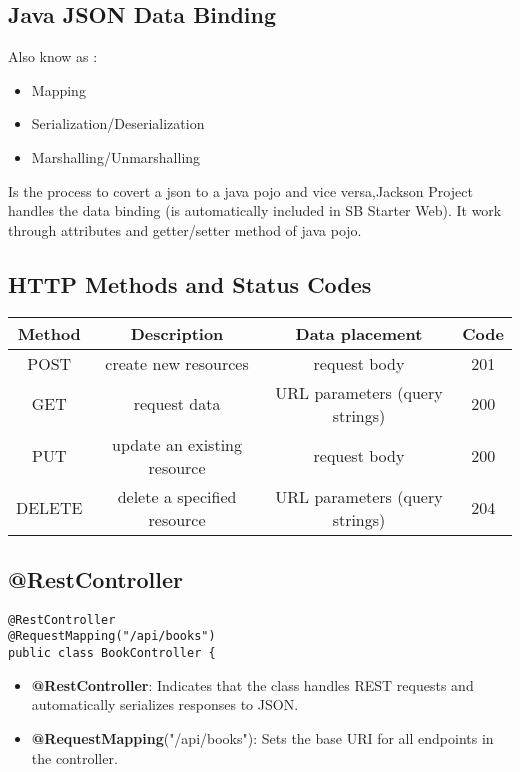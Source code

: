 \documentclass[a4paper, 12pt]{article}
\begin{document}
    \subsection{Java JSON Data Binding}
    Also know as :
    \begin{itemize}
        \item Mapping
        \item Serialization/Deserialization
        \item Marshalling/Unmarshalling
    \end{itemize}
    Is the process to covert a json to a java pojo and vice versa,Jackson Project handles the data binding (is automatically included in SB Starter Web). It work through attributes and getter/setter method of java pojo.

    \subsection{HTTP Methods and Status Codes}
    \begin{table}[h!]
        \centering
        \begin{tabular}{|c|c|c|c|}
            \hline
            Method & Description                 & Data placement                 & Code \\ \hline
            POST   & create new resources        & request body                   & 201  \\ \hline
            GET    & request data                & URL parameters (query strings) & 200  \\ \hline
            PUT    & update an existing resource & request body                   & 200  \\ \hline
            DELETE & delete a specified resource & URL parameters (query strings) & 204  \\ \hline
        \end{tabular}
        \label{tab:Annotation}
    \end{table}

    \subsection{@RestController}
    \begin{lstlisting}
@RestController
@RequestMapping("/api/books")
public class BookController {
    \end{lstlisting}
    \begin{itemize}
        \item \textbf{@RestController}: Indicates that the class handles REST requests and automatically serializes responses to JSON.
        \item \textbf{@RequestMapping}("/api/books"): Sets the base URI for all endpoints in the controller.
    \end{itemize}
\end{document}

